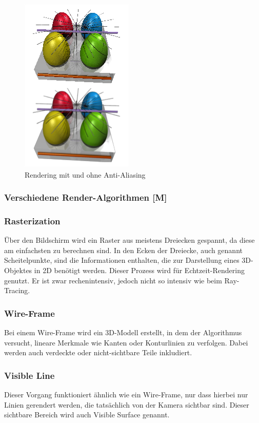 \begin{figure}
    \centering
    \includegraphics[scale=0.7]{pics/anti-aliasing.png}
    \caption{Rendering mit und ohne Anti-Aliasing \cite{AntiAliasing}}
    \label{fig:impl:anti-aliasing}
\end{figure}

\subsubsection{Verschiedene Render-Algorithmen [M]}
\subsubsection{Rasterization}
Über den Bildschirm wird ein Raster aus meistens Dreiecken gespannt, da diese am einfachsten zu berechnen sind. In den Ecken der Dreiecke, auch genannt Scheitelpunkte, sind die Informationen enthalten, die zur Darstellung eines 3D-Objektes in 2D benötigt werden. Dieser Prozess wird für Echtzeit-Rendering genutzt. Er ist zwar rechenintensiv, jedoch nicht so intensiv wie beim Ray-Tracing. \cite{RayTracingRasterization}

\subsubsection{Wire-Frame}
Bei einem Wire-Frame wird ein 3D-Modell erstellt, in dem der Algorithmus versucht, lineare Merkmale wie Kanten oder Konturlinien zu verfolgen. Dabei werden auch verdeckte oder nicht-sichtbare Teile inkludiert. 
\cite{Rendering3DModels} 

\subsubsection{Visible Line}
Dieser Vorgang funktioniert ähnlich wie ein Wire-Frame, nur dass hierbei nur Linien gerendert werden, die tatsächlich von der Kamera sichtbar sind. Dieser sichtbare Bereich wird auch Visible Surface genannt. 
\cite{Rendering3DModels} 

